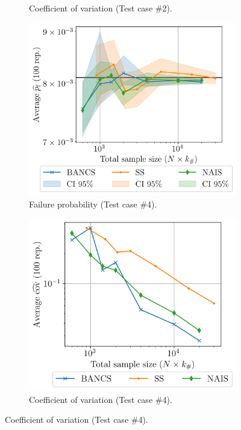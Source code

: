 \begin{figure}
\begin{subfigure}[b]{0.47\linewidth}
        \caption{Coefficient of variation (Test case \#2).}
    \end{subfigure}
    \begin{subfigure}[b]{0.49\linewidth}
        \centering
        \includegraphics[width=\linewidth]{part3/figures/BANCS/RP38_mean.png}
        \caption{Failure probability (Test case \#4).}
    \end{subfigure}
    \begin{subfigure}[b]{0.47\linewidth}
        \centering
        \includegraphics[width=\linewidth]{part3/figures/BANCS/RP38_cov.png}
        \caption{Coefficient of variation (Test case \#4).}
    \end{subfigure}


\end{figure}
